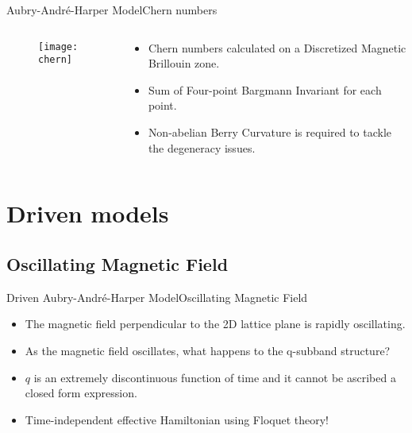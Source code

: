 \documentclass{beamer}
\begin{document}
\begin{frame}{Aubry-Andr\'e-Harper Model}{Chern numbers}
\begin{columns}
 \begin{column}{0.5\textwidth}
  \begin{figure}[h]
 \centering
 \texttt{[image: chern]} 
\end{figure}
 \end{column}
 \begin{column}{0.5\textwidth}
   \begin{itemize}
  \item Chern numbers calculated on a Discretized Magnetic Brillouin zone.
  \item Sum of Four-point Bargmann Invariant for each point.
  \item Non-abelian Berry Curvature is required to tackle the degeneracy issues.
 \end{itemize}
 \end{column}
\end{columns}
\end{frame}

\section{Driven models}
\subsection{Oscillating Magnetic Field}

\begin{frame}{Driven Aubry-Andr\'e-Harper Model}{Oscillating Magnetic Field}
\begin{itemize}
 \item The magnetic field perpendicular to the 2D lattice plane is rapidly oscillating.
 \item As the magnetic field oscillates, what happens to the q-subband structure? 
 \item $q$ is an extremely discontinuous function of time and it cannot be ascribed a closed form expression.
 \item Time-independent effective Hamiltonian using Floquet theory!
\end{itemize}
\end{frame}
\end{document}
